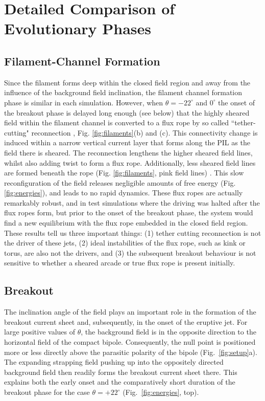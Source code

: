 \documentclass[twocolumn]{aastex6}
\begin{document}
\section{{Detailed Comparison of Evolutionary Phases}}
\label{sec:phases}

\subsection{Filament-Channel Formation}
\label{subsec:filament}
{Since the filament forms deep within the closed field region and away from the influence of the background field inclination, the filament channel formation phase is similar in each simulation. However, when $\theta = -22^\circ$ and $0^\circ$ the onset of the breakout phase is delayed long enough (see below) that the highly sheared field within the filament channel is converted to a flux rope by so called ``tether-cutting" reconnection \citep{Moore1992,Moore2001}, Fig. \ref{fig:filaments}(b) and (c). This connectivity change is induced within a narrow vertical current layer that forms along the PIL as the field there is sheared. The reconnection lengthens the higher sheared field lines, whilst also adding twist to form a flux rope. Additionally, less sheared field lines are formed beneath the rope (Fig. \ref{fig:filaments}, pink field lines) \citep{vanBallegooijen1989}. This slow reconfiguration of the field releases negligible amounts of free energy (Fig. \ref{fig:energies}), and leads to no rapid dynamics. These flux ropes are actually remarkably robust, and in test simulations where the driving was halted after the flux ropes form, but prior to the onset of the breakout phase, the system would find a new equilibrium with the flux rope embedded in the closed field region. These results tell us three important things: (1) tether cutting reconnection is not the driver of these jets, (2) ideal instabilities of the flux rope, such as kink or torus, are also not the drivers, and (3) the subsequent breakout behaviour is not sensitive to whether a sheared arcade or true flux rope is present initially. }



\subsection{Breakout}
\label{subsec:breakout}
The inclination angle of the field plays an important role in the formation of the breakout current sheet and, subsequently, in the onset of the eruptive jet. For large positive values of $\theta$, the background field is in the opposite direction to the horizontal field of the compact bipole. Consequently, the null point is positioned more or less directly above the parasitic polarity of the bipole (Fig.\ \ref{fig:setup}a). The expanding strapping field pushing up into the oppositely directed background field then readily forms the breakout current sheet there. This explains both the early onset and the comparatively short duration of the breakout phase for the case $\theta = +22^\circ$ (Fig.\ \ref{fig:energies}, top).
\end{document}
